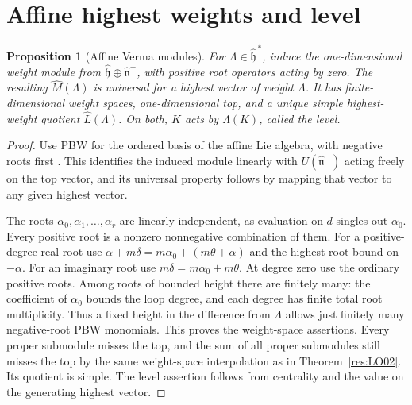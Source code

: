 \documentclass[11pt,oneside,openany]{book}
\newtheorem{proposition}[theorem]{Proposition}
\theoremstyle{definition}
\theoremstyle{remark}
\begin{document}
\section{Affine highest weights and level}

\begin{proposition}[Affine Verma modules]
\label{res:LO11}
For \(\Lambda\in\widehat{\mathfrak h}^{\,*}\), induce the
one-dimensional weight module from
\(\widehat{\mathfrak h}\oplus\widehat{\mathfrak n}^+\), with
positive root operators acting by zero. The resulting
\(\widehat M(\Lambda)\) is universal for a highest vector
of weight \(\Lambda\). It has finite-dimensional weight spaces,
one-dimensional top, and a unique simple highest-weight quotient
\(\widehat L(\Lambda)\). On both, \(K\) acts by
\(\Lambda(K)\), called the level.
\end{proposition}
\begin{proof}
Use PBW for the ordered basis of the affine Lie algebra,
with negative roots first \cite[Result A05, PDF pp.~8--9]{mg-lie}.
This identifies the induced module linearly with
\(U(\widehat{\mathfrak n}^-)\) acting freely on the top
vector, and its universal property follows by mapping that
vector to any given highest vector.

The roots \(\alpha_0,\alpha_1,\ldots,\alpha_r\) are linearly
independent, as evaluation on \(d\) singles out \(\alpha_0\).
Every positive root is a nonzero nonnegative combination
of them. For a positive-degree real root use
\(\alpha+m\delta=m\alpha_0+(m\theta+\alpha)\) and the
highest-root bound on \(-\alpha\).
For an imaginary root use \(m\delta=m\alpha_0+m\theta\).
At degree zero use the ordinary positive roots. Among roots
of bounded height there are finitely many: the coefficient
of \(\alpha_0\) bounds the loop degree, and each degree
has finite total root multiplicity. Thus a fixed height in
the difference from \(\Lambda\) allows just finitely many
negative-root PBW monomials. This proves the weight-space
assertions. Every proper submodule misses the top, and
the sum of all proper submodules still misses the top
by the same weight-space interpolation as in
Theorem~\ref{res:LO02}. Its quotient is simple.
The level assertion follows from centrality and the value
on the generating highest vector.
\end{proof}
\end{document}
